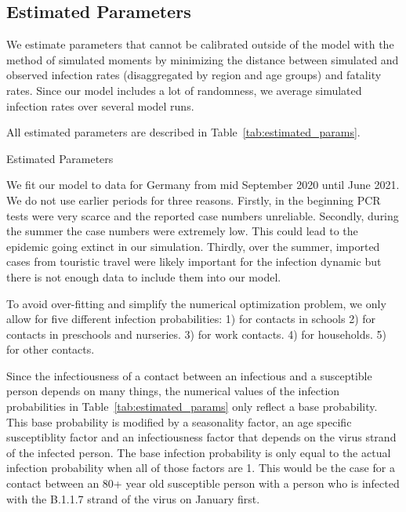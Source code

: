 \subsection{Estimated Parameters}
\label{subsec:estimated_params}


\FloatBarrier

We estimate parameters that cannot be calibrated outside of the model with the method of
simulated moments \citep{McFadden1989} by minimizing the distance between simulated and
observed infection rates (disaggregated by region and age groups) and fatality rates.
Since our model includes a lot of randomness, we average simulated infection rates over
several model runs.

All estimated parameters are described in Table~\ref{tab:estimated_params}.

\begin{landscape}

\begin{table}[htb]
    \centering
    \caption{Estimated Parameters}
    \label{tab:estimated_params}
    
\end{table}

\end{landscape}


We fit our model to data for Germany from mid September 2020 until June 2021. We do not
use earlier periods for three reasons. Firstly, in the beginning PCR tests were very
scarce and the reported case numbers unreliable. Secondly, during the summer the case
numbers were extremely low. This could lead to the epidemic going extinct in our
simulation. Thirdly, over the summer, imported cases from touristic travel were likely
important for the infection dynamic but there is not enough data to include them into our
model.

To avoid over-fitting and simplify the numerical optimization problem, we only allow for
five different infection probabilities: 1) for contacts in schools 2) for contacts in
preschools and nurseries. 3) for work contacts. 4) for households. 5) for other
contacts.

Since the infectiousness of a contact between an infectious and a susceptible
person depends on many things, the numerical values of the infection probabilities in
Table~\ref{tab:estimated_params} only reflect a base probability. This
base probability is modified by a seasonality factor, an age specific
susceptiblity factor and an infectiousness factor that depends on the virus strand
of the infected person. The base infection probability is only equal to the actual
infection probability when all of those factors are 1. This would be the
case for a contact between an 80+ year old susceptible person with a person who is
infected with the B.1.1.7 strand of the virus on January first.

